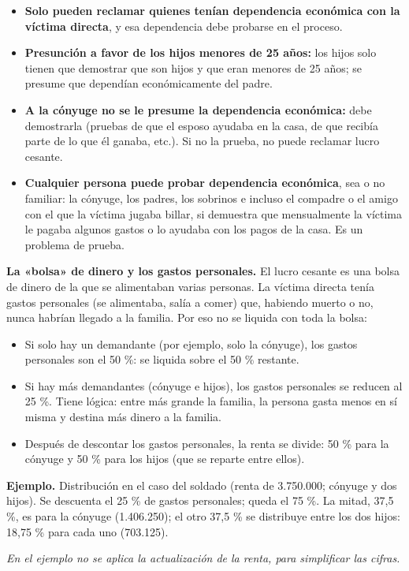 \begin{itemize}
\item \textbf{Solo pueden reclamar quienes tenían dependencia económica con la víctima directa}, y esa dependencia debe probarse en el proceso.
\item \textbf{Presunción a favor de los hijos menores de 25 años:} los hijos solo tienen que demostrar que son hijos y que eran menores de 25 años; se presume que dependían económicamente del padre.
\item \textbf{A la cónyuge no se le presume la dependencia económica:} debe demostrarla (pruebas de que el esposo ayudaba en la casa, de que recibía parte de lo que él ganaba, etc.). Si no la prueba, no puede reclamar lucro cesante.
\item \textbf{Cualquier persona puede probar dependencia económica}, sea o no familiar: la cónyuge, los padres, los sobrinos e incluso el compadre o el amigo con el que la víctima jugaba billar, si demuestra que mensualmente la víctima le pagaba algunos gastos o lo ayudaba con los pagos de la casa. Es un problema de prueba.
\end{itemize}
\textbf{La «bolsa» de dinero y los gastos personales.} El lucro cesante es una bolsa de dinero de la que se alimentaban varias personas. La víctima directa tenía gastos personales (se alimentaba, salía a comer) que, habiendo muerto o no, nunca habrían llegado a la familia. Por eso no se liquida con toda la bolsa:

\begin{itemize}
\item Si solo hay un demandante (por ejemplo, solo la cónyuge), los gastos personales son el 50 \%: se liquida sobre el 50 \% restante.
\item Si hay más demandantes (cónyuge e hijos), los gastos personales se reducen al 25 \%. Tiene lógica: entre más grande la familia, la persona gasta menos en sí misma y destina más dinero a la familia.
\item Después de descontar los gastos personales, la renta se divide: 50 \% para la cónyuge y 50 \% para los hijos (que se reparte entre ellos).
\end{itemize}
\begin{ejemplo}
\textcolor[HTML]{4F6228}{\textbf{Ejemplo. }}Distribución en el caso del soldado (renta de 3.750.000; cónyuge y dos hijos). Se descuenta el 25 \% de gastos personales; queda el 75 \%. La mitad, 37,5 \%, es para la cónyuge (1.406.250); el otro 37,5 \% se distribuye entre los dos hijos: 18,75 \% para cada uno (703.125).
\end{ejemplo}
{\small \textcolor[HTML]{6B6B6B}{\textit{En el ejemplo no se aplica la actualización de la renta, para simplificar las cifras.}}}


